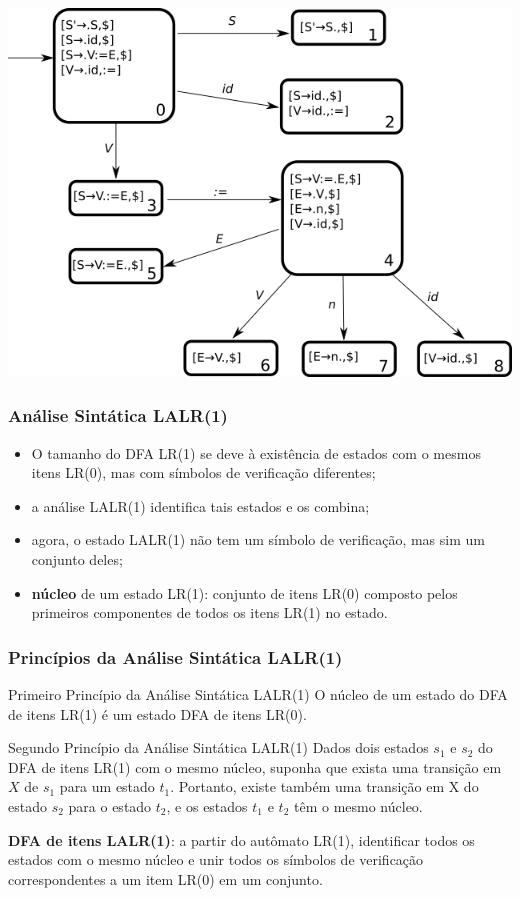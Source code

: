 \documentclass[table]{beamer}
\begin{document}
\begin{frame}
   \includegraphics[width=\linewidth,height=\textheight,keepaspectratio]{figuras/iddfalr1.png}
\end{frame}

\begin{frame}
   \frametitle{Análise Sintática LALR(1)}
   \begin{itemize}
      \item O tamanho do DFA LR(1) se deve à existência de estados com o mesmos itens LR(0), mas com símbolos de verificação diferentes;
      \item a análise LALR(1) identifica tais estados e os combina;
      \item agora, o estado LALR(1) não tem um símbolo de verificação, mas sim um conjunto deles;
      \item \textbf{núcleo} de um estado LR(1): conjunto de itens LR(0) composto pelos primeiros componentes de todos os itens LR(1) no estado.
   \end{itemize}
\end{frame}

\begin{frame}
   \frametitle{Princípios da Análise Sintática LALR(1)}
   \begin{block}{Primeiro Princípio da Análise Sintática LALR(1)}
   O núcleo de um estado do DFA de itens LR(1) é um estado DFA de itens LR(0).
   \end{block}
 
   \begin{block}{Segundo Princípio da Análise Sintática LALR(1)}
   Dados dois estados $s_{1}$ e $s_{2}$ do DFA de itens LR(1) com o mesmo núcleo, suponha que exista uma transição em $X$ de $s_{1}$ para um estado $t_{1}$. Portanto, existe também uma transição em X do estado $s_{2}$ para o estado $t_{2}$, e os estados $t_{1}$ e $t_{2}$ têm o mesmo núcleo.
   \end{block}
   \textbf{DFA de itens LALR(1)}: a partir do autômato LR(1), identificar todos os estados com o mesmo núcleo e unir todos os símbolos de verificação correspondentes a um item LR(0) em um conjunto.
\end{frame}
\end{document}
